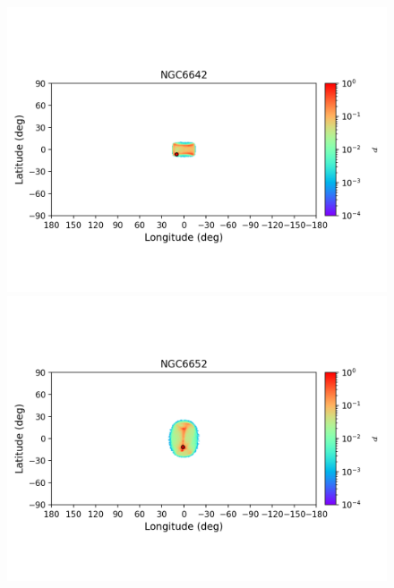 \begin{figure}
\begin{center}
                \includegraphics[clip=true, trim = 0mm 20mm 0mm 10mm, width=1\columnwidth]{images/error_plots_NGC6642.png}
                \includegraphics[clip=true, trim = 0mm 20mm 0mm 10mm, width=1\columnwidth]{images/error_plots_NGC6652.png}
                

\end{center}
\end{figure}
